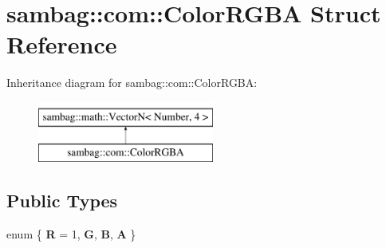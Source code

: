 \hypertarget{structsambag_1_1com_1_1_color_r_g_b_a}{
\section{sambag::com::ColorRGBA Struct Reference}
\label{structsambag_1_1com_1_1_color_r_g_b_a}
}
Inheritance diagram for sambag::com::ColorRGBA:\begin{figure}[H]
\begin{center}
\leavevmode
\includegraphics[height=2.000000cm]{structsambag_1_1com_1_1_color_r_g_b_a}
\end{center}
\end{figure}
\subsection*{Public Types}
\begin{DoxyCompactItemize}
\item 
enum \{ {\bfseries R} =  1, 
{\bfseries G}, 
{\bfseries B}, 
{\bfseries A}
 \}
\end{DoxyCompactItemize}
